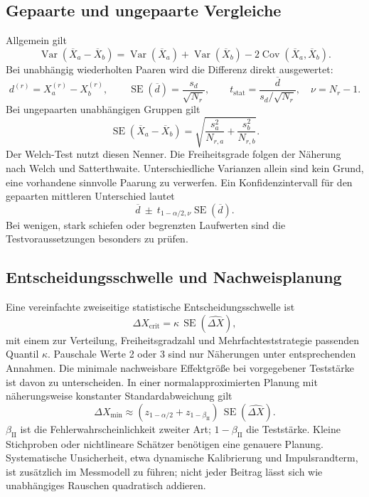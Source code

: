 \documentclass[11pt,a4paper]{article}
\newcommand{\Var}{\operatorname{Var}}
\newcommand{\Cov}{\operatorname{Cov}}
\newcommand{\SE}{\operatorname{SE}}
\begin{document}
\subsection{Gepaarte und ungepaarte Vergleiche}
Allgemein gilt
\begin{equation}
\Var(\overline X_a-\overline X_b)=\Var(\overline X_a)+\Var(\overline X_b)-2\Cov(\overline X_a,\overline X_b).
\end{equation}
Bei unabhängig wiederholten Paaren wird die Differenz direkt ausgewertet:
\begin{equation}
d^{(r)}=X_a^{(r)}-X_b^{(r)},\qquad
\SE(\overline d)=\frac{s_d}{\sqrt{N_r}},\qquad
 t_{\mathrm{stat}}=\frac{\overline d}{s_d/\sqrt{N_r}},\quad \nu=N_r-1.
\label{eq:paired}
\end{equation}
Bei ungepaarten unabhängigen Gruppen gilt
\begin{equation}
\SE(\overline X_a-\overline X_b)=\sqrt{\frac{s_a^2}{N_{r,a}}+\frac{s_b^2}{N_{r,b}}}.
\end{equation}
Der Welch-Test nutzt diesen Nenner. Die Freiheitsgrade folgen der Näherung nach Welch und Satterthwaite. Unterschiedliche Varianzen allein sind kein Grund, eine vorhandene sinnvolle Paarung zu verwerfen. Ein Konfidenzintervall für den gepaarten mittleren Unterschied lautet
\begin{equation}
\overline d\ \pm\ t_{1-\alpha/2,\nu}\SE(\overline d).
\end{equation}
Bei wenigen, stark schiefen oder begrenzten Laufwerten sind die Testvoraussetzungen besonders zu prüfen.

\subsection{Entscheidungsschwelle und Nachweisplanung}\label{sec:schwelle}
Eine vereinfachte zweiseitige statistische Entscheidungsschwelle ist
\begin{equation}
\Delta X_{\mathrm{crit}}=\kappa\,\SE(\widehat{\Delta X}),
\label{eq:crit}
\end{equation}
mit einem zur Verteilung, Freiheitsgradzahl und Mehrfachteststrategie passenden Quantil $\kappa$. Pauschale Werte 2 oder 3 sind nur Näherungen unter entsprechenden Annahmen.
Die minimale nachweisbare Effektgröße bei vorgegebener Teststärke ist davon zu unterscheiden. In einer normalapproximierten Planung mit näherungsweise konstanter Standardabweichung gilt
\begin{equation}
\Delta X_{\min}\approx(z_{1-\alpha/2}+z_{1-\beta_{\mathrm{II}}})\,\SE(\widehat{\Delta X}).
\label{eq:power}
\end{equation}
$\beta_{\mathrm{II}}$ ist die Fehlerwahrscheinlichkeit zweiter Art; $1-\beta_{\mathrm{II}}$ die Teststärke. Kleine Stichproben oder nichtlineare Schätzer benötigen eine genauere Planung. Systematische Unsicherheit, etwa dynamische Kalibrierung und Impulsrandterm, ist zusätzlich im Messmodell zu führen; nicht jeder Beitrag lässt sich wie unabhängiges Rauschen quadratisch addieren.
\end{document}
